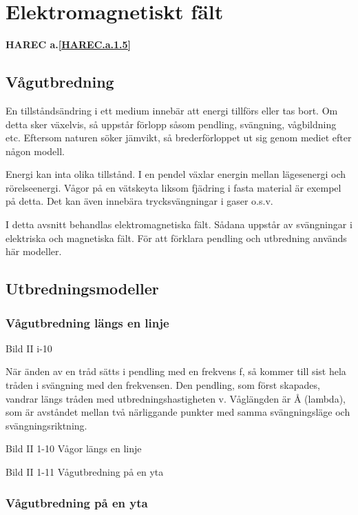 \section{Elektromagnetiskt fält}
\textbf{HAREC a.\ref{HAREC.a.1.5}\label{myHAREC.a.1.5}}

\subsection{Vågutbredning}

En tillståndsändring i ett medium innebär att energi tillförs eller tas bort. Om detta
sker växelvis, så uppstår förlopp såsom pendling, svängning, vågbildning etc.
Eftersom naturen söker jämvikt, så brederförloppet ut sig genom mediet efter någon modell.

Energi kan inta olika tillstånd. I en pendel växlar energin mellan lägesenergi och
rörelseenergi. Vågor på en vätskeyta liksom fjädring i fasta material är exempel på
detta. Det kan även innebära trycksvängningar i gaser o.s.v.

I detta avsnitt behandlas elektromagnetiska fält. Sådana uppstår av svängningar i
elektriska och magnetiska fält. För att förklara pendling och utbredning används här
modeller.

\subsection{Utbredningsmodeller}

\subsubsection{Vågutbredning längs en linje}

Bild II i-10

När änden av en tråd sätts i pendling med en frekvens f, så kommer till sist hela tråden i
svängning med den frekvensen. Den pendling, som först skapades, vandrar längs tråden med
utbredningshastigheten v. Våglängden är Å (lambda), som är avståndet mellan två
närliggande punkter med samma svängningsläge och svängningsriktning.

Bild II 1-10 Vågor längs en linje

Bild II 1-11 Vågutbredning på en yta

\subsubsection{Vågutbredning på en yta}

